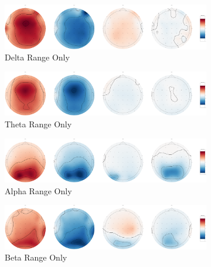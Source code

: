 \documentclass[11pt]{article}
\begin{document}
\begin{figure}
     \centering
     \begin{subfigure}[b]{1\textwidth}
         \centering
         \includegraphics[width=\textwidth]{Delta_Top.png}
         \caption{Delta Range Only}
         \label{fig:Delta}
     \end{subfigure}
     \hfill
     \begin{subfigure}[b]{1\textwidth}
         \centering
         \includegraphics[width=\textwidth]{Theta_Top.png}
         \caption{Theta Range Only}
         \label{fig:Theta}
     \end{subfigure}
     \hfill
     \begin{subfigure}[b]{1\textwidth}
         \centering
         \includegraphics[width=\textwidth]{Alpha_Top.png}
         \caption{Alpha Range Only}
         \label{fig:Alpha}
     \end{subfigure}
     \hfill
     \begin{subfigure}[b]{1\textwidth}
         \centering
         \includegraphics[width=\textwidth]{Beta_Top.png}
         \caption{Beta Range Only}
         \label{fig:Beta}
     \end{subfigure}
     \hfill
     \begin{subfigure}[b]{1\textwidth}

\end{subfigure}
\end{figure}
\end{document}
